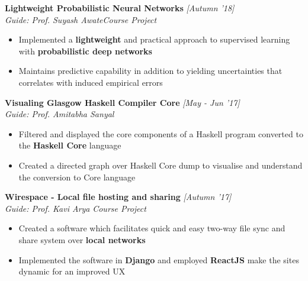 \documentclass{article}
\begin{document}
\hspace{0pt}\textbf{\large{Lightweight Probabilistic Neural Networks}} \hfill{\sl [Autumn '18]}\\
{\it Guide: Prof. Suyash Awate}\hfill{\sl Course Project}\\
\vspace{-19pt}
\begin{itemize}[itemsep = -2pt, leftmargin=*]
	\item Implemented a \textbf{lightweight} and practical approach to supervised learning with \textbf{probabilistic deep networks}
	\item Maintains predictive capability in addition to yielding uncertainties that correlates with induced empirical errors
\end{itemize}
\vspace{-2pt}

\hspace{-14pt}\textbf{\large{Visualing Glasgow Haskell Compiler Core}} \hfill{\sl [May - Jun '17]}\\
{\it Guide: Prof. Amitabha Sanyal}\\%
\vspace{-19pt}
\begin{itemize}[itemsep = -2pt, leftmargin=*]
	\item Filtered and displayed the core components of a Haskell program converted to the \textbf{Haskell Core} language
	\item Created a directed graph over Haskell Core dump to visualise and understand the conversion to Core language
\end{itemize}
\vspace{-2pt}

\hspace{-14pt}\textbf{\large{Wirespace - Local file hosting and sharing}} \hfill{\sl [Autumn '17]}\\
{\it Guide: Prof. Kavi Arya} \hfill{\sl Course Project}\\
\vspace{-19pt}
\begin{itemize}[itemsep = -2pt, leftmargin=*]
	\item Created a software which facilitates quick and easy two-way file sync and share system over \textbf{local networks}
	\item Implemented the software in \textbf{Django} and employed \textbf{ReactJS} make the sites dynamic for an improved UX
\end{itemize}
\vspace{-2pt}
\end{document}
